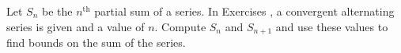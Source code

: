 {\noindent Let $S_n$ be the $n^\text{th}$ partial sum of a series. In Exercises}
{, a convergent alternating series is given and a value of $n$. Compute $S_n$ and $S_{n+1}$ and use these values to find bounds on the sum of the series.   
}
